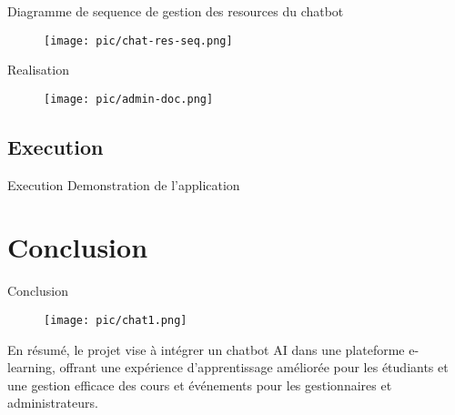 \documentclass[aspectratio=169]{beamer}
\begin{document}
\begin{frame}{Diagramme de sequence de gestion des resources du chatbot}
\begin{figure}[htpb]
        \centering
        \texttt{[image: pic/chat-res-seq.png]}
\end{figure}
\end{frame}

\begin{frame}{Realisation}
\begin{figure}[htpb]
        \centering
        \texttt{[image: pic/admin-doc.png]}
\end{figure}
\end{frame}

\subsection{Execution}
\begin{frame}{Execution}
    Demonstration de l'application
\end{frame}

\section{Conclusion}

\begin{frame}{Conclusion}
    \begin{figure}[htpb]
        \centering
        \texttt{[image: pic/chat1.png]}
    \end{figure}
    En résumé, le projet vise à intégrer un chatbot AI dans une plateforme e-learning, offrant une expérience d’apprentissage améliorée pour les étudiants et une gestion efficace des cours et événements pour les gestionnaires et administrateurs.
\end{frame}
\end{document}
